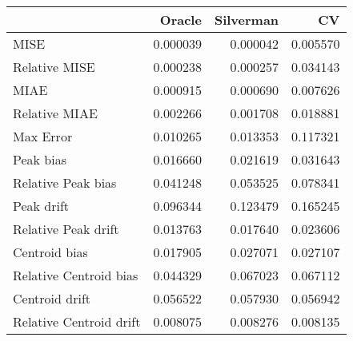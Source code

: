 \begin{tabular}{lrrr}
  \hline
 & Oracle & Silverman & CV \\ 
  \hline
MISE & 0.000039 & 0.000042 & 0.005570 \\ 
  Relative MISE & 0.000238 & 0.000257 & 0.034143 \\ 
  MIAE & 0.000915 & 0.000690 & 0.007626 \\ 
  Relative MIAE & 0.002266 & 0.001708 & 0.018881 \\ 
  Max Error & 0.010265 & 0.013353 & 0.117321 \\ 
  Peak bias & 0.016660 & 0.021619 & 0.031643 \\ 
  Relative Peak bias & 0.041248 & 0.053525 & 0.078341 \\ 
  Peak drift & 0.096344 & 0.123479 & 0.165245 \\ 
  Relative Peak drift & 0.013763 & 0.017640 & 0.023606 \\ 
  Centroid bias & 0.017905 & 0.027071 & 0.027107 \\ 
  Relative Centroid bias & 0.044329 & 0.067023 & 0.067112 \\ 
  Centroid drift & 0.056522 & 0.057930 & 0.056942 \\ 
  Relative Centroid drift & 0.008075 & 0.008276 & 0.008135 \\ 
   \hline
\end{tabular}
